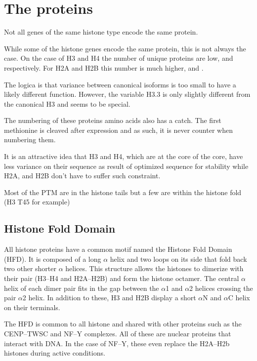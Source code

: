\section{The proteins}

  Not all genes of the same histone type encode the same protein.

  While some of the histone genes encode the same protein, this is not always the
  case. On the case of H3 and H4 the number of unique proteins are low, \HThreeUniqueProteins{}
  and \HFourUniqueProteins{} respectively. For H2A and H2B this number is much higher, \HTwoAUniqueProteins{}
  and \HTwoBUniqueProteins{}.

  The logica is that variance between canonical isoforms is too small to have a likely
  different function. However, the variable H3.3 is only slightly different from the
  canonical H3 and seems to be special.

  The numbering of these proteins amino acids also has a catch. The first methionine
  is cleaved after expression and as such, it is never counter when numbering them.


  It is an attractive idea that H3 and H4, which are at the core of the core,
  have less variance on their sequence as result of optimized sequence for stability
  while H2A, and H2B don't have to suffer such constraint.

  Most of the PTM are in the histone tails but a few are within the histone fold (H3 T45 for example)

  \subsection{Histone Fold Domain}

    All histone proteins have a common motif named the Histone Fold Domain (HFD).
    It is composed of a long $\alpha$ helix and two loops on its side that fold
    back two other shorter $\alpha$ helices. This structure allows the histones
    to dimerize with their pair (H3--H4 and H2A--H2B) and form the histone
    octamer. The central $\alpha$ helix of each dimer pair fits in the gap between
    the $\alpha$1 and $\alpha$2 helices crossing the pair $\alpha$2 helix. In
    addition to these, H3 and H2B display a short $\alpha$N and $\alpha$C helix
    on their terminals.

    The HFD is common to all histone and shared with other
    proteins such as the CENP--TWSC and NF--Y complexes. All of these are nuclear
    proteins that interact with DNA. In the case of NF--Y, these even replace
    the H2A--H2b histones during active conditions.

